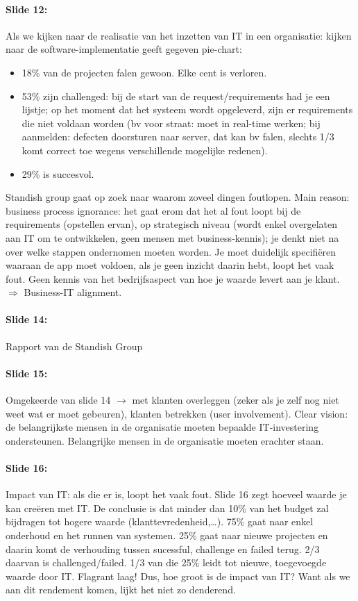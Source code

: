 \documentclass[10pt,a4paper]{report}
\begin{document}
\paragraph{Slide 12:}Als we kijken naar de realisatie van het inzetten van IT in een organisatie: kijken naar de software-implementatie geeft gegeven pie-chart:
\begin{itemize}
\item 18\% van de projecten falen gewoon. Elke cent is verloren. 
\item 53\% zijn challenged: bij de start van de request/requirements had je een lijstje; op het moment dat het systeem wordt opgeleverd, zijn er requirements die niet voldaan worden (bv voor straat: moet in real-time werken; bij aanmelden: defecten doorsturen naar server, dat kan bv falen, slechts 1/3 komt correct toe wegens verschillende mogelijke redenen). 
\item 29\% is succesvol.
\end{itemize}
Standish group gaat op zoek naar waarom zoveel dingen foutlopen. Main reason: business process ignorance: het gaat erom dat het al fout loopt bij de requirements (opstellen ervan), op strategisch niveau (wordt enkel overgelaten aan IT om te ontwikkelen, geen mensen met business-kennis); je denkt niet na over welke stappen ondernomen moeten worden. Je moet duidelijk specifiëren waaraan de app moet voldoen, als je geen inzicht daarin hebt, loopt het vaak fout. Geen kennis van het bedrijfsaspect van hoe je waarde levert aan je klant. $\Rightarrow$ Business-IT alignment.

\paragraph{Slide 14:}Rapport van de Standish Group 

\paragraph{Slide 15:}Omgekeerde van slide 14 $\rightarrow$ met klanten overleggen (zeker als je zelf nog niet weet wat er moet gebeuren), klanten betrekken (user involvement). Clear vision: de belangrijkste mensen in de organisatie moeten bepaalde IT-investering ondersteunen. Belangrijke mensen in de organisatie moeten erachter staan. 

\paragraph{Slide 16:}Impact van IT: als die er is, loopt het vaak fout. Slide 16 zegt hoeveel waarde je kan creëren met IT. De conclusie is dat minder dan 10\% van het budget zal bijdragen tot hogere waarde (klanttevredenheid,…). 75\% gaat naar enkel onderhoud en het runnen van systemen. 25\% gaat naar nieuwe projecten en daarin komt de verhouding tussen sucessful, challenge en failed terug. 2/3 daarvan is challenged/failed. 1/3 van die 25\% leidt tot nieuwe, toegevoegde waarde door IT. Flagrant laag! Dus, hoe groot is de impact van IT? Want als we aan dit rendement komen, lijkt het niet zo denderend. 
\end{document}
